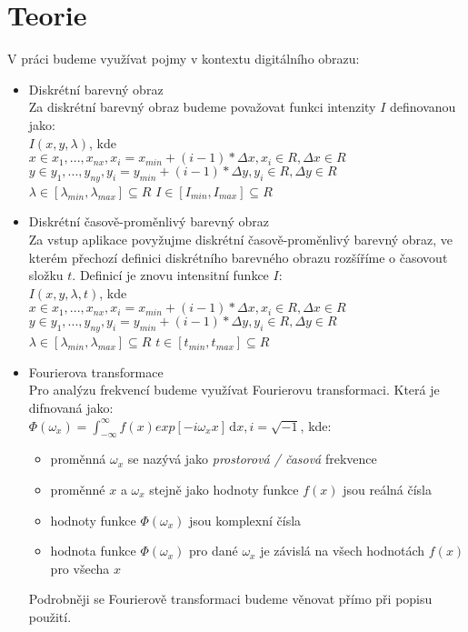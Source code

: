 \documentclass[
  digital, %
  table,   %
%
  lof,     %
  lot,     %
]{fithesis3}
\begin{document}
\chapter{Teorie}
V práci budeme využívat pojmy v kontextu digitálního obrazu:
\begin{itemize}
	\item Diskrétní barevný obraz \\
    Za diskrétní barevný obraz budeme považovat funkci intenzity $I$ definovanou jako: \\
	$I(x,y,\lambda)$, kde \\
	$x \in {x_1, ... , x_{nx}}, x_i = x_{min}+(i-1)*\Delta x, x_i \in R, \Delta x \in R$ \\	 	 	 $y \in {y_1, ... , y_{ny}}, y_i = y_{min}+(i-1)*\Delta y, y_i \in R, \Delta y \in R$ \\
	$\lambda \in [\lambda_{min}, \lambda_{max}] \subseteq R$
	$I \in [I_{min}, I_{max}] \subseteq R$

    \item Diskrétní časově-proměnlivý barevný obraz \\
    Za vstup aplikace povyžujme diskrétní časově-proměnlivý barevný obraz, ve kterém přechozí definici diskrétního barevného obrazu rozšíříme o časovout složku $t$. Definicí je znovu intensitní funkce $I$: \\

	$I(x,y,\lambda, t)$, kde \\
    $x \in {x_1, ... , x_{nx}}, x_i = x_{min}+(i-1)*\Delta x, x_i \in R, \Delta x \in R$ \\	 	 	 $y \in {y_1, ... , y_{ny}}, y_i = y_{min}+(i-1)*\Delta y, y_i \in R, \Delta y \in R$ \\
	$\lambda \in [\lambda_{min}, \lambda_{max}] \subseteq R$
    $t \in [t_{min}, t_{max}] \subseteq R$

    \item{Fourierova transformace} \\
    Pro analýzu frekvencí budeme využívat Fourierovu transformaci. Která je difnovaná jako: \\
    $\Phi(\omega_x)= \int_{-\infty}^{\infty} \! f(x)exp[-i\omega_xx]\, \mathrm{d}x, i =\sqrt{-1}$, kde: \\
    \begin{itemize}
    	\item proměnná $\omega_x$ se nazývá jako \emph{prostorová / časová} frekvence \\
	    \item proměnné $x$ a $\omega_x$ stejně jako hodnoty funkce $f(x)$ jsou reálná čísla \\
		\item hodnoty funkce $\Phi(\omega_x)$ jsou komplexní čísla \\
	    \item hodnota funkce $\Phi(\omega_x)$ pro dané $\omega_x$ je závislá na všech hodnotách $f(x)$ pro všecha $x$\\
	\end{itemize}
    Podrobněji se Fourierově transformaci budeme věnovat přímo při popisu použití.
\end{itemize}
\end{document}

